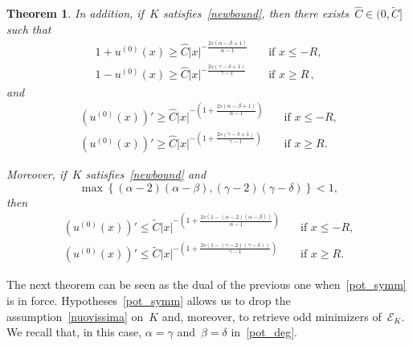 \documentclass[10pt,a4paper]{amsart}
\newtheorem{theorem}{Theorem}[section]
\numberwithin{equation}{section}
\newcommand{\Ec}{\mathcal{E}_K}
\begin{document}
\begin{theorem}
In addition, if~$K$ satisfies~\eqref{newbound}, then there exists~$\widehat{C}\in (0, \widetilde{C}]$ such that
         \begin{equation}\label{asymp_decay_lowbound}
          	\begin{split}
          1+u^{(0)}(x) \geq \widehat{C} |x|^{-\frac{2s(\alpha-\beta+1)}{\alpha-1}} &\quad\mbox{if } x\leq -R,\\   
         1 - u^{(0)}(x) \geq \widehat{C}|x|^{-\frac{2s(\gamma-\delta+1)}{\gamma-1}} &\quad\mbox{if } x\geq R\,,
           \end{split}
          \end{equation}
and
\begin{equation}\label{398r7gree}
\begin{split}
 (u^{(0)}(x))' \geq \widehat{C} |x|^{-\left(1+\frac{2s(\alpha-\beta+1)}{\alpha-1}\right)} & \quad\mbox{if } x\leq -R,\\
(u^{(0)}(x))' \geq  \widehat{C}|x|^{-\left( 1+\frac{2s(\gamma-\delta+1)}{\gamma-1}\right)}  &\quad\mbox{if } x\geq R.
\end{split}
\end{equation}

Moreover, if~$K$ satisfies~\eqref{newbound} and
\begin{equation}\label{ricdifar}
\max \left\{ (\alpha-2)(\alpha-\beta),  (\gamma-2)(\gamma-\delta) \right\} <1,
\end{equation}
then
 \begin{equation}\label{eq:asymp-derivata}
\begin{split}
 (u^{(0)}(x))' \leq \widetilde{C}|x|^{-\left(1+\frac{2s(1-(\alpha-2)(\alpha-\beta))}{\alpha-1}\right)}  &\quad\mbox{if } x\leq -R ,\\
 (u^{(0)}(x))' \leq \widetilde{C}|x|^{-\left(1+\frac{2s(1-(\gamma-2)(\gamma-\delta))}{\gamma-1}\right)} &\quad\mbox{if } x\geq R.
\end{split}
 \end{equation}   
                \end{theorem}
 
The next theorem can be seen as the dual of the previous one when~\eqref{pot_symm} is in force. Hypotheses~\eqref{pot_symm} allows us to drop the assumption~\eqref{nuovissima} on~$K$ and, moreover, to retrieve odd minimizers of~$\Ec$. We recall  that, in this case, $\alpha=\gamma$ and~$\beta= \delta$ in~\eqref{pot_deg}.
              
\end{document}

